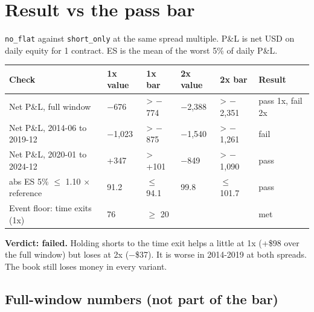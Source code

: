 \documentclass{article}
\begin{document}
\section{Result vs the pass bar}

\texttt{no\_\allowbreak{}flat} against \texttt{short\_\allowbreak{}only} at the same spread multiple. P\&L is net USD on daily equity for 1 contract. ES is the mean of the worst 5\% of daily P\&L.

\begin{center}\small
\begin{tabularx}{\linewidth}{>{\raggedright\arraybackslash}X l l l l >{\raggedright\arraybackslash}X}
\toprule
\textbf{Check} & \textbf{1x value} & \textbf{1x bar} & \textbf{2x value} & \textbf{2x bar} & \textbf{Result} \\
\midrule
Net P\&L, full window & \ensuremath{-}676 & > \ensuremath{-}774 & \ensuremath{-}2,388 & > \ensuremath{-}2,351 & pass 1x, fail 2x \\
Net P\&L, 2014-06 to 2019-12 & \ensuremath{-}1,023 & > \ensuremath{-}875 & \ensuremath{-}1,540 & > \ensuremath{-}1,261 & fail \\
Net P\&L, 2020-01 to 2024-12 & +347 & > +101 & \ensuremath{-}849 & > \ensuremath{-}1,090 & pass \\
abs ES 5\% \ensuremath{\leq} 1.10 \ensuremath{\times} reference & 91.2 & \ensuremath{\leq} 94.1 & 99.8 & \ensuremath{\leq} 101.7 & pass \\
Event floor: time exits (1x) & 76 & \ensuremath{\geq} 20 &  &  & met \\
\bottomrule
\end{tabularx}
\end{center}

\textbf{Verdict: failed.} Holding shorts to the time exit helps a little at 1x (+\$98 over the full window) but loses at 2x (\ensuremath{-}\$37). It is worse in 2014-2019 at both spreads. The book still loses money in every variant.

\subsection{Full-window numbers (not part of the bar)}
\end{document}
